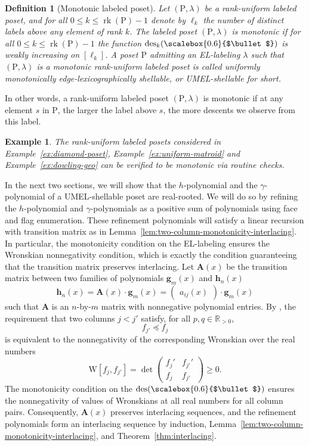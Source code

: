 \documentclass[11pt,a4paper]{amsart}
\theoremstyle{results}
\theoremstyle{definitions}
\newtheorem{definition}[thm]{Definition}
\newtheorem{example}[thm]{Example}
\def\R{\mathbb{R}}
\def\P{\mathbb{P}}
\newcommand{\rk}{\operatorname{rk}}
\newcommand{\des}{\mathrm{des}}
\newcommand{\medbullet}{\mathbin{\vcenter{\hbox{\scalebox{0.6}{$\bullet$}}}}}
\renewcommand{\P}{\mathrm{P}}
\begin{document}
\begin{definition}[Monotonic labeled poset]
Let $(\P, \lambda)$ be a rank-uniform labeled poset, and for all $0 \leqslant k \leqslant \rk(\P)-1$ denote by $\ell_k$ the number of distinct labels above any element of rank $k$. The labeled poset $(\P, \lambda)$ is \textit{monotonic} if for all $0 \leqslant k \leqslant \rk(\P)-1$ the function $\des_k(\medbullet)$ is weakly increasing on $[\ell_k]$. A poset $\P$ admitting an EL-labeling $\lambda$ such that $(\P, \lambda)$ is a monotonic rank-uniform labeled poset is called \textit{uniformly monotonically edge-lexicographically shellable}, or \textit{UMEL-shellable} for short.
\end{definition}
In other words, a rank-uniform labeled poset $(\P, \lambda)$ is monotonic if at any element $s$ in $\P$, the larger the label above $s$, the more descents we observe from this label. 
\begin{example}
The rank-uniform labeled posets considered in Example~\ref{ex:diamond-poset}, Example~\ref{ex:uniform-matroid} and Example~\ref{ex:dowling-geo} can be verified to be monotonic via routine checks. 
\end{example}
In the next two sections, we will show that the $h$-polynomial and the $\gamma$-polynomial of a UMEL-shellable poset are real-rooted. We will do so by refining the $h$-polynomial and $\gamma$-polynomials as a positive sum of polynomials using face and flag enumeration. These refinement polynomials will satisfy a linear recursion with transition matrix as in Lemma~\ref{lem:two-column-monotonicity-interlacing}. In particular, the monotonicity condition on the EL-labeling ensures the Wronskian nonnegativity condition, which is exactly the condition guaranteeing that the transition matrix preserves interlacing. Let $\mathbf{A}(x)$ be the transition matrix between two families of polynomials $\mathbf{g}_m(x)$ and $\mathbf{h}_n(x)$
\[
\mathbf{h}_n(x) = \mathbf{A}(x) \cdot \mathbf{g}_{m}(x) = \begin{pmatrix} a_{ij}(x) \end{pmatrix} \cdot \mathbf{g}_m(x)
\] such that $\mathbf{A}$ is an $n$-by-$m$ matrix with nonnegative polynomial entries. By , the requirement that two columns $j < j'$ satisfy, for all $p, q \in \R_{> 0}$, 
\[
f_{j'} \preceq f_{j}
\] is equivalent to the nonnegativity of the corresponding Wronskian over the real numbers
\[
\textrm{W}[f_j, f_{j'}] = \det \begin{pmatrix} 
f_{j}' & f_{j'}' \\
f_{j}  & f_{j'} 
\end{pmatrix} \geqslant 0. 
\]
The monotonicity condition on the $\des( \medbullet)$ ensures the nonnegativity of values of Wronskians at all real numbers for all column pairs. Consequently, $\mathbf{A}(x)$ preserves interlacing sequences, and the refinement polynomials form an interlacing sequence by induction, Lemma~\ref{lem:two-column-monotonicity-interlacing}, and Theorem~\ref{thm:interlacing}. 
\end{document}
